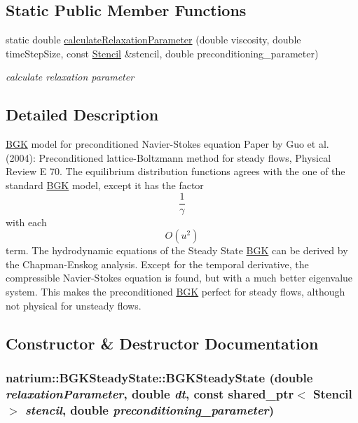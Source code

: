 \subsection*{Static Public Member Functions}
\begin{DoxyCompactItemize}
\item 
static double \hyperlink{classnatrium_1_1BGKSteadyState_a2cd6628c71475663e204656147de99b8}{calculateRelaxationParameter} (double viscosity, double timeStepSize, const \hyperlink{classnatrium_1_1Stencil}{Stencil} \&stencil, double preconditioning\_\-parameter)
\begin{DoxyCompactList}\small\item\em calculate relaxation parameter \item\end{DoxyCompactList}\end{DoxyCompactItemize}


\subsection{Detailed Description}
\hyperlink{classnatrium_1_1BGK}{BGK} model for preconditioned Navier-\/Stokes equation Paper by Guo et al. (2004): Preconditioned lattice-\/Boltzmann method for steady flows, Physical Review E 70. The equilibrium distribution functions agrees with the one of the standard \hyperlink{classnatrium_1_1BGK}{BGK} model, except it has the factor \[\frac{1}{\gamma}\] with each \[ O(u^2) \] term. The hydrodynamic equations of the Steady State \hyperlink{classnatrium_1_1BGK}{BGK} can be derived by the Chapman-\/Enskog analysis. Except for the temporal derivative, the compressible Navier-\/Stokes equation is found, but with a much better eigenvalue system. This makes the preconditioned \hyperlink{classnatrium_1_1BGK}{BGK} perfect for steady flows, although not physical for unsteady flows. 

\subsection{Constructor \& Destructor Documentation}
\hypertarget{classnatrium_1_1BGKSteadyState_aa8521523f8603fdc5a391d6e6388667c}{
\subsubsection[{BGKSteadyState}]{\setlength{\rightskip}{0pt plus 5cm}natrium::BGKSteadyState::BGKSteadyState (double {\em relaxationParameter}, \/  double {\em dt}, \/  const shared\_\-ptr$<$ {\bf Stencil} $>$ {\em stencil}, \/  double {\em preconditioning\_\-parameter})}}
\label{classnatrium_1_1BGKSteadyState_aa8521523f8603fdc5a391d6e6388667c}



